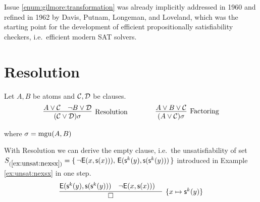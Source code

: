 Issue \ref{enum:gilmore:transformation} was already implicitly 
addressed in 1960 \cite{Davis:1960:CPQ:321033.321034}
and refined in 1962 \cite{Davis:1962:MPT:368273.368557}
by Davis, Putnam, Longeman, and Loveland, 
which was the starting point for the development of efficient propositionally satisfiability checkers, i.e.~efficient modern SAT solvers.

\section{Resolution}

\begin{definition}[Resolution] Let $A, B$ be atoms and ${\mathcal C},{\mathcal D}$ be clauses.
	\begin{gather*}
	\infer
	[\text{Resolution}] 
	{(\mcC\lor\mcD)\sigma}
	{A\lor\mcC&\lnot B\lor\mcD}
	\qquad\qquad
	\infer
	[\text{Factoring}] 
	{(A\lor\mcC)\sigma}
	{A\lor B\lor\mcC}
	\end{gather*}
	\begin{center}
		where
		$\sigma=\operatorname{mgu}(A,B)$
	\end{center}
\end{definition}

\begin{example}
	With Resolution we can derive the empty clause, i.e.~the unsatisfiability of set
	$S_{(\ref{ex:unsat:nexsx})} =
	\{\,
	{ \lnot{\mathsf{E}}(x, {\mathsf s}(x)))},\, 
	{ {\mathsf{E}}({\mathsf s}^k(y), {\mathsf s}({\mathsf s}^k(y)))}
	\,\}$ 
	introduced in Example \ref{ex:unsat:nexsx} 
	in one step. 
	\begin{gather*}
	\infer[\{x\mapsto\msucc^k(y)\}]{
		\square
	}{
		{ \mE(\msucc^k(y), \msucc(\msucc^k(y)))} &
		{ \lnot\mE(x, \msucc(x)))} &
	}
	\end{gather*}
\end{example}

